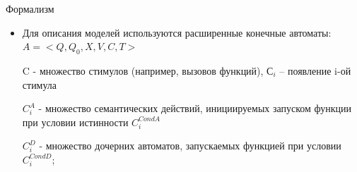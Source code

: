 \documentclass[12pt]{beamer}
\begin{document}
{
\begin{frame}[fragile]{Формализм}
  \begin{mybox}[]
  \begin{itemize}
  	\item Для описания моделей используются расширенные конечные автоматы:
  	$A = <Q, Q_0, X, V, C, T>$
  	
  	C - множество стимулов (например, вызовов функций), $С_i$ – появление i-ой стимула
  	
  	$C_i^A$ - множество семантических действий, инициируемых запуском функции при условии истинности $C_i^{CondA}$
  	
  	$C_i^D$ - множество дочерних автоматов, запускаемых функцией при условии $C_i^{CondD}$;
  \end{itemize}
  \end{mybox}
\end{frame}
}
\end{document}
